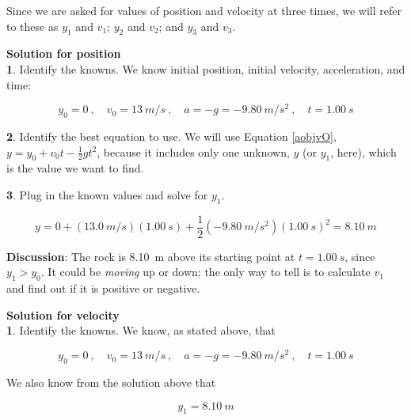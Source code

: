 \documentclass[main-ap-physics.tex]{subfiles}
\begin{document}
\vspace{1em}

Since we are asked for values of position and velocity at three times, we will refer to these as $y_1$ and $v_1$; $y_2$ and $v_2$; and $y_3$ and $v_3$.

\vspace{1em}

\textbf{Solution for position}\\
\textbf{1}. Identify the knowns. We know initial position, initial velocity, acceleration, and time:

\begin{equation*}
    y_0 = 0 \ , \quad
    v_0 = \SI{13}{m/s}  \ , \quad
    a = -g = -\SI{9.80}{m/s^2}  \ , \quad
    t = \SI{1.00}{s}
\end{equation*}

\textbf{2}. Identify the best equation to use. We will use Equation \eqref{aobjvO}, $y = y_0 + v_0 t - \frac{1}{2} g t^2$, because it includes only one unknown, $y$ (or $y_1$, here), which is the value we want to find.

\vspace{1em}

\textbf{3}. Plug in the known values and solve for $y_1$.

\begin{equation*}
    y = 0 + \left(\SI{13.0}{m/s}\right) \left(\SI{1.00}{s}\right)
        + \frac{1}{2} \left(-\SI{9.80}{m/s^2}\right) \left(\SI{1.00}{s}\right)^2
        = \SI{8.10}{m}
\end{equation*}

\textbf{Discussion}: The rock is \SI{8.10}{m} above its starting point at $t = \SI{1.00}{s}$, since $y_1 > y_0$. It could be \textit{moving} up or down; the only way to tell is to calculate $v_1$ and find out if it is positive or negative.

\vspace{1em}

\textbf{Solution for velocity}\\
\textbf{1}. Identify the knowns. We know, as stated above, that 

\begin{equation*}
    y_0 = 0 \ , \quad
    v_0 = \SI{13}{m/s}  \ , \quad
    a = -g = -\SI{9.80}{m/s^2}  \ , \quad
    t = \SI{1.00}{s}
\end{equation*}

We also know from the solution above that 

\begin{equation*}
    y_1 = \SI{8.10}{m}
\end{equation*}
\end{document}
